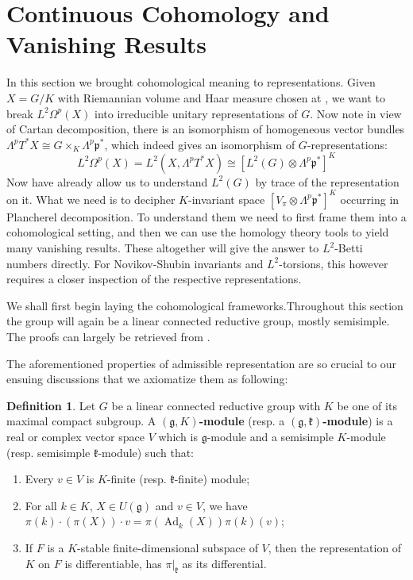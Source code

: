 \documentclass[11pt]{report}
\theoremstyle{definition}
\newtheorem{Def}{Definition}[chapter]
\theoremstyle{plain}
\DeclareMathOperator{\Ad}{Ad}
\newcommand{\Lie}[1]{\mathfrak{#1}}
\begin{document}
\section{Continuous Cohomology and Vanishing Results}
In this section we brought cohomological meaning to representations. Given $X=G/K$ with Riemannian volume and Haar measure chosen at , we want to break $L^2\Omega^p(X)$ into irreducible unitary representations of $G$. Now note in view of Cartan decomposition, there is an isomorphism of homogeneous vector bundles $\Lambda^pT^*X\cong G\times_K \Lambda^p\Lie{p}^*$, which indeed gives an isomorphism of $G$-representations:
\begin{equation}
L^2\Omega^p(X)=L^2(X, \Lambda^pT^*X)\cong [L^2(G)\otimes \Lambda^p\Lie{p}^*]^K
\end{equation}
Now  have already allow us to understand $L^2(G)$ by trace of the representation on it. What we need is to decipher $K$-invariant space $[V_\pi\otimes \Lambda^p\Lie{p}^*]^K$ occurring in Plancherel decomposition. To understand them we need to first frame them into a cohomological setting, and then we can use the homology theory tools to yield many vanishing results. These altogether will give the answer to $L^2$-Betti numbers directly. For Novikov-Shubin invariants and $L^2$-torsions, this however requires a closer inspection of the respective representations.
\par We shall first begin laying the cohomological frameworks.Throughout this section the group will again be a linear connected reductive group, mostly semisimple. The proofs can largely be retrieved from \cite{borel2013}.
\par The aforementioned properties of admissible representation are so crucial to our ensuing discussions that we axiomatize them as following:
\begin{Def}
	Let $G$ be a linear connected reductive group with $K$ be one of its maximal compact subgroup. A \textbf{$(\Lie{g}, K)$-module} (resp. a \textbf{$(\Lie{g}, \Lie{k})$-module}) is a real or complex vector space $V$ which is $\Lie{g}$-module and a semisimple $K$-module (resp. semisimple $\Lie{k}$-module) such that:
	\begin{enumerate}
		\item Every $v\in V$ is $K$-finite (resp. $\Lie{k}$-finite) module;
		\item For all $k\in K$, $X\in U(\Lie{g})$ and $v\in V$, we have $\pi(k)\cdot (\pi(X))\cdot v=\pi(\Ad_k(X))\pi(k)(v)$;
		\item If $F$ is a $K$-stable finite-dimensional subspace of $V$, then the representation of $K$ on $F$ is differentiable, has $\pi|_{\Lie{k}}$ as its differential.
	\end{enumerate}
\end{Def} 
\end{document}
